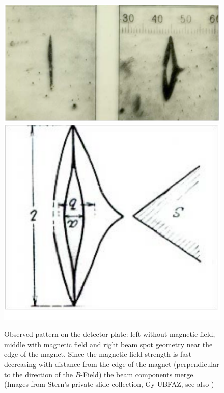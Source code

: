 \documentclass{article}
\begin{document}
\begin{figure}
\begin{center}
\includegraphics[scale=0.45]{figures/SGE_pattern}
\includegraphics[scale=0.45]{figures/SGE_pattern2}
\caption{Observed pattern on the detector plate: left without magnetic field, middle with magnetic field and right beam spot geometry near the edge of the magnet. Since the magnetic field strength is fast decreasing with distance from the edge of the magnet (perpendicular to the direction of the $B$-Field) the beam components merge. (Images from Stern's private slide collection, Gy-UBFAZ, see also \cite[pp.~350, 351]{GerlachWEtal1922Nachweis})}
\label{fig:SGEobservedpattern}
\end{center}
\end{figure}
\end{document}

